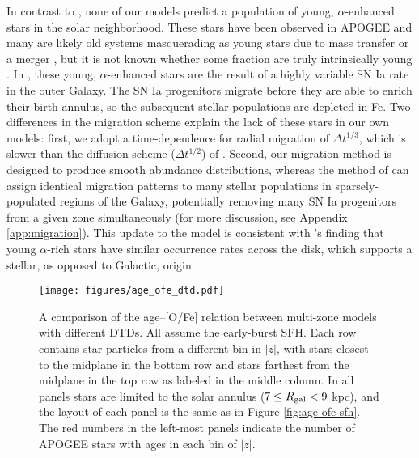 \documentclass[twocolumn,twocolappendix]{aastex631}
\begin{document}
In contrast to , none of our models predict a population of young, $\alpha$-enhanced stars in the solar neighborhood. These stars have been observed in APOGEE \citep[e.g.,][]{Martig2016-CNAbundances,SilvaAguirre2018-YoungAlphaEnhanced} and many are likely old systems masquerading as young stars due to mass transfer or a merger \citep[e.g.,][]{Yong2016-YoungAlphaRich}, but it is not known whether some fraction are truly intrinsically young \citep{HekkerJohnson2019-YoungAlphaRich}. In , these young, $\alpha$-enhanced stars are the result of a highly variable SN Ia rate in the outer Galaxy. The SN Ia progenitors migrate before they are able to enrich their birth annulus, so the subsequent stellar populations are depleted in Fe. Two differences in the migration scheme explain the lack of these stars in our own models: first, we adopt a time-dependence for radial migration of $\Delta t^{1/3}$, which is slower than the diffusion scheme ($\Delta t^{1/2}$) of . Second, our migration method is designed to produce smooth abundance distributions, whereas the method of  can assign identical migration patterns to many stellar populations in sparsely-populated regions of the Galaxy, potentially removing many SN Ia progenitors from a given zone simultaneously (for more discussion, see Appendix \ref{app:migration}). This update to the model is consistent with \citeauthor{Grisoni2024-YoungAlphaRich}'s \citeyearpar{Grisoni2024-YoungAlphaRich} finding that young $\alpha$-rich stars have similar occurrence rates across the disk, which supports a stellar, as opposed to Galactic, origin.

\begin{figure*}
    \centering
    \texttt{[image: figures/age\_ofe\_dtd.pdf]}
    \caption{A comparison of the age--[O/Fe] relation between multi-zone models with different DTDs. All assume the early-burst SFH. Each row contains star particles from a different bin in $|z|$, with stars closest to the midplane in the bottom row and stars farthest from the midplane in the top row as labeled in the middle column. In all panels stars are limited to the solar annulus ($7\leq R_{\rm gal}<9$ kpc), and the layout of each panel is the same as in Figure \ref{fig:age-ofe-sfh}. The red numbers in the left-most panels indicate the number of APOGEE stars with  ages in each bin of $|z|$.}
    \label{fig:age-ofe-dtd}
\end{figure*}
\end{document}
